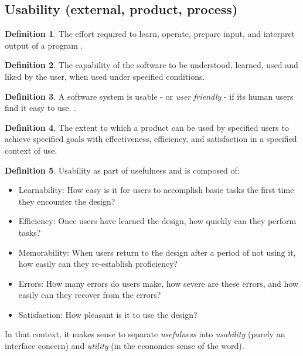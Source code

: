 \documentclass[letterpaper, cleveref]{lipics-v2019}
\newcommand{\authornote}[3]{\textcolor{#1}{[#3 ---#2]}}
\newcommand{\authornote}[3]{}
\newcommand{\jc}[1]{\authornote{red}{JC}{#1}} %
\theoremstyle{definition}
\newtheorem{defn}{Definition}
\begin{document}

\subsection{Usability (external, product, process)} %

\begin{defn} \label{UsabilityMcCallEtAl1977}
  The effort required to learn, operate, prepare input, and interpret output
  of a program \citep{McCallEtAl1977}.
\end{defn}

\begin{defn} \label{UsabilityISO9126}
  The capability of the software to be understood, learned, used and liked by
  the user, when used under specified conditions. \cite{ISO9126}
\end{defn}

\begin{defn} \label{UsabilityGhezziEtAl2003}
  A software system is usable - or \emph{user friendly} - if its human users
  find it easy to use. \citep[p.\ 22]{GhezziEtAl2003}.
\end{defn}

\begin{defn} \label{UsabilityISO16982:2002}
  The extent to which a product can be used by specified users to achieve
  specified goals with effectiveness, efficiency, and satisfaction in a
  specified context of use. \citep{ISO16982:2002, ISO9241:11}
\end{defn}

\begin{defn} \label{UsabilityNielsenNorman}
Usability as part of usefulness and is composed of:
\begin{itemize}
\item Learnability: How easy is it for users to accomplish basic tasks the first
  time they encounter the design?
\item Efficiency: Once users have learned the design, how quickly can they
  perform tasks?
\item Memorability: When users return to the design after a period of not using
  it, how easily can they re-establish proficiency?
\item Errors: How many errors do users make, how severe are these errors, and
  how easily can they recover from the errors?
\item Satisfaction: How pleasant is it to use the design?
\end{itemize}
In that context, it makes sense to separate \emph{usefulness} into
\emph{usability} (purely an interface concern) and \emph{utility} (in the
economics sense of the word).
\cite{NielsenNorman} %
\end{defn}
\end{document}
